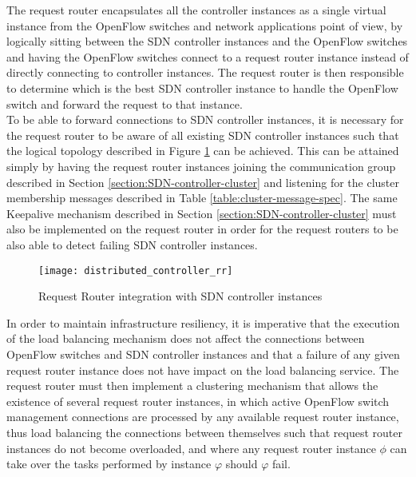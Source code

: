 %
The request router encapsulates all the controller instances as a single virtual instance from the OpenFlow switches and network applications point of view, by logically sitting between the \gls{SDN} controller instances and the OpenFlow switches and having the OpenFlow switches connect to a request router instance instead of directly connecting to controller instances.
The request router is then responsible to determine which is the best \gls{SDN} controller instance to handle the OpenFlow switch and forward the request to that instance.\\
%
To be able to forward connections to \gls{SDN} controller instances, it is necessary for the request router to be aware of all existing \gls{SDN} controller instances such that the logical topology described in Figure \ref{fig:distributed_controller_rr} can be achieved.
This can be attained simply by having the request router instances joining the communication group described in Section \ref{section:SDN-controller-cluster} and listening for the cluster membership messages described in Table \ref{table:cluster-message-spec}.
The same \gls{Keepalive} mechanism described in Section \ref{section:SDN-controller-cluster} must also be implemented on the request router in order for the request routers to be also able to detect failing \gls{SDN} controller instances.\\
%
\begin{figure}
	\centering
	\texttt{[image: distributed\_controller\_rr]}
	\caption{Request Router integration with \gls{SDN} controller instances}
	\label{fig:distributed_controller_rr}
\end{figure}
%
In order to maintain infrastructure resiliency, it is imperative that the execution of the load balancing mechanism does not affect the connections between OpenFlow switches and \gls{SDN} controller instances and that a failure of any given request router instance does not have impact on the load balancing service.
The request router must then implement a clustering mechanism that allows the existence of several request router instances, in which active OpenFlow switch management connections are processed by any available request router instance, thus load balancing the connections between themselves such that request router instances do not become overloaded, and where any request router instance $\phi$ can take over the tasks performed by instance $\varphi$ should $\varphi$ fail.\\
